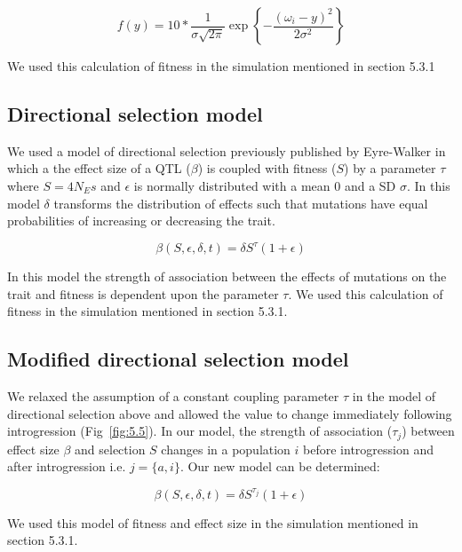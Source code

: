 $$f(y) = 10 * \frac{1}{\sigma\sqrt{2\pi}} \exp{\left\{ -\frac{(\omega_i-y)^2}{2\sigma^2}\right \}}$$

We used this calculation of fitness in the simulation mentioned in section 5.3.1

\subsection{Directional selection model}
We used a model of directional selection previously published by Eyre-Walker \cite{eyre2010genetic} in which a the effect size of a QTL ($\beta$) is coupled with fitness ($S$) by a parameter $\tau$ where $S = 4N_Es$ and $\epsilon$ is normally distributed with a mean 0 and a SD $\sigma$. In this model $\delta$ transforms the distribution of effects such that mutations have equal probabilities of increasing or decreasing the trait.

$$\beta(S,\epsilon,\delta,t) = \delta S^{\tau}(1+\epsilon)$$

In this model the strength of association between the effects of mutations on the trait and fitness is dependent upon the parameter $\tau$. We used this calculation of fitness in the simulation mentioned in section 5.3.1.

\subsection{Modified directional selection model}
We relaxed the assumption of a constant coupling parameter $\tau$ in the model of directional selection above and allowed the value to change immediately following introgression (Fig~\ref{fig:5.5}). In our model, the strength of association ($\tau_j$) between effect size $\beta$ and selection $S$ changes in a population $i$ before introgression and after introgression i.e. $j = \{a,i\}$. Our new model can be determined:  

$$\beta(S,\epsilon,\delta,t) = \delta S^{\tau_j}(1+\epsilon)$$

We used this model of fitness and effect size in the simulation mentioned in section 5.3.1.

